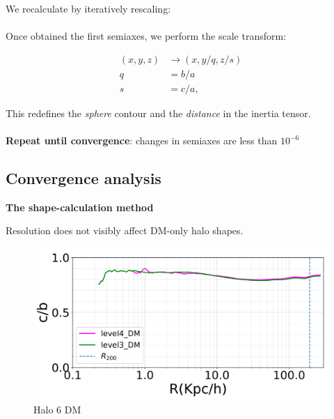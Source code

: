 \documentclass[xcolor=dvipsnames]{beamer}
\begin{document}
\begin{frame}
\small

We recalculate by iteratively rescaling:\\~\\

Once obtained the first semiaxes, we perform the scale transform:

\begin{align}
(x,y,z) &\rightarrow (x,y/q,z/s) \\
q &=  b/a\\
s &= c/a,
\end{align}

This redefines the \textit{sphere} contour and the \textit{distance} in the inertia tensor.\\~\\

\textbf{Repeat until convergence}: changes in semiaxes are less than $10^{-6}$


\end{frame}

\subsection{Convergence analysis}
\begin{frame}
\centering
\LARGE
\textbf{The shape-calculation method}
\normalsize
\end{frame}


\begin{frame}
\centering
Resolution does not visibly affect DM-only halo shapes.
\begin{figure}[!ht]
  \centering
  \includegraphics[width=1\columnwidth]{./pics/halo6_DM_3Vs4_good.png}
  \caption{Halo 6 DM}
  
\end{figure}
\end{frame}
\end{document}

